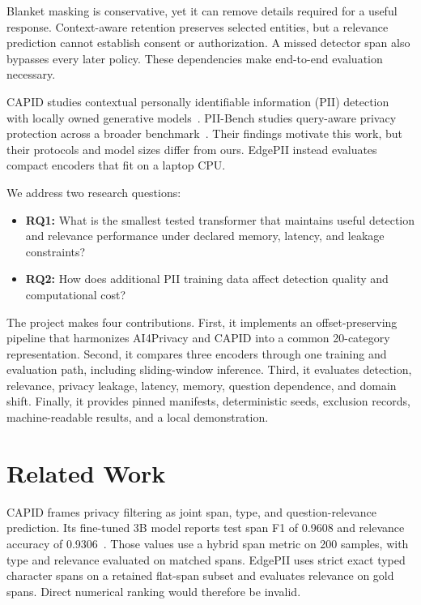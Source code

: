 \documentclass[conference]{IEEEtran}
\begin{document}
Blanket masking is conservative, yet it can remove details required for a useful response. Context-aware retention preserves selected entities, but a relevance prediction cannot establish consent or authorization. A missed detector span also bypasses every later policy. These dependencies make end-to-end evaluation necessary.

CAPID studies contextual personally identifiable information (PII) detection with locally owned generative models~\cite{capid}. PII-Bench studies query-aware privacy protection across a broader benchmark~\cite{piibench}. Their findings motivate this work, but their protocols and model sizes differ from ours. EdgePII instead evaluates compact encoders that fit on a laptop CPU.

We address two research questions:
\begin{itemize}
    \item \textbf{RQ1:} What is the smallest tested transformer that maintains useful detection and relevance performance under declared memory, latency, and leakage constraints?
    \item \textbf{RQ2:} How does additional PII training data affect detection quality and computational cost?
\end{itemize}

The project makes four contributions. First, it implements an offset-preserving pipeline that harmonizes AI4Privacy and CAPID into a common 20-category representation. Second, it compares three encoders through one training and evaluation path, including sliding-window inference. Third, it evaluates detection, relevance, privacy leakage, latency, memory, question dependence, and domain shift. Finally, it provides pinned manifests, deterministic seeds, exclusion records, machine-readable results, and a local demonstration.

\section{Related Work}
CAPID frames privacy filtering as joint span, type, and question-relevance prediction. Its fine-tuned 3B model reports test span F1 of 0.9608 and relevance accuracy of 0.9306~\cite{capid}. Those values use a hybrid span metric on 200 samples, with type and relevance evaluated on matched spans. EdgePII uses strict exact typed character spans on a retained flat-span subset and evaluates relevance on gold spans. Direct numerical ranking would therefore be invalid.
\end{document}
